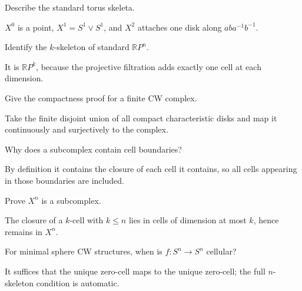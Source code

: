 \begin{problem}\label{prob:viii06-04}
Describe the standard torus skeleta.
\end{problem}
\begin{solution}
\(X^0\) is a point, \(X^1=S^1\vee S^1\), and \(X^2\) attaches one disk along \(aba^{-1}b^{-1}\).
\end{solution}

\begin{problem}\label{prob:viii06-05}
Identify the \(k\)-skeleton of standard \(\mathbb RP^n\).
\end{problem}
\begin{solution}
It is \(\mathbb RP^k\), because the projective filtration adds exactly one cell at each dimension.
\end{solution}

\begin{problem}\label{prob:viii06-06}
Give the compactness proof for a finite CW complex.
\end{problem}
\begin{solution}
Take the finite disjoint union of all compact characteristic disks and map it continuously and surjectively to the complex.
\end{solution}

\begin{problem}\label{prob:viii06-07}
Why does a subcomplex contain cell boundaries?
\end{problem}
\begin{solution}
By definition it contains the closure of each cell it contains, so all cells appearing in those boundaries are included.
\end{solution}

\begin{problem}\label{prob:viii06-08}
Prove \(X^n\) is a subcomplex.
\end{problem}
\begin{solution}
The closure of a \(k\)-cell with \(k\le n\) lies in cells of dimension at most \(k\), hence remains in \(X^n\).
\end{solution}

\begin{problem}\label{prob:viii06-09}
For minimal sphere CW structures, when is \(f:S^n\to S^n\) cellular?
\end{problem}
\begin{solution}
It suffices that the unique zero-cell maps to the unique zero-cell; the full \(n\)-skeleton condition is automatic.
\end{solution}

